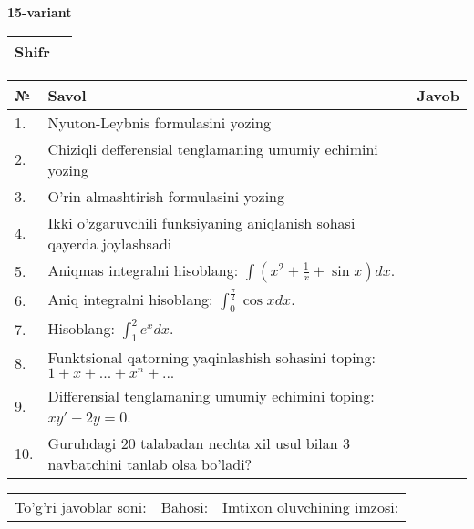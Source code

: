 \documentclass{article}
\begin{document}
  \egroup
  
  \newpage
  
  
  \textbf{15-variant}\\
  
  \bgroup
  \def\arraystretch{1.6} %
  
  \begin{tabular}{|m{5.7cm}|m{9.5cm}|}
  \hline
  Shifr & \\
  \hline
  \end{tabular}
  
  \vspace{1cm}
  
  \begin{tabular}{|m{0.7cm}|m{10cm}|m{4cm}|}
  \hline
  № & Savol & Javob \\
  \hline
  1. & Nyuton-Leybnis formulasini yozing &  \\
  \hline
  2. & Chiziqli defferensial tenglamaning umumiy echimini yozing &  \\
  \hline
  3. & O'rin almashtirish formulasini yozing &  \\
  \hline
  4. & Ikki o'zgaruvchili funksiyaning aniqlanish sohasi qayerda joylashsadi &  \\
  \hline
  5. & Aniqmas integralni hisoblang: \(\int {\left( x^{2} + \frac{1}{x} + \sin x \right)dx}\). &  \\
  \hline
  6. & Aniq integralni hisoblang: \(\int_{0}^{\frac{\pi}{2}}{\cos xdx}\). &  \\
  \hline
  7. & Hisoblang: \(\int_{1}^{2}{e^{x}dx}\). &  \\
  \hline
  8. & Funktsional qatorning yaqinlashish sohasini toping:\(1 + x + ... + x^{n} + ...\) &  \\
  \hline
  9. & Differensial tenglamaning umumiy echimini toping: \(xy' - 2y = 0\). &  \\
  \hline
  10. & Guruhdagi 20 talabadan nechta xil usul bilan 3 navbatchini tanlab olsa bo'ladi? &  \\
  \hline
  \end{tabular}
  
  \vspace{1cm}
  
  \begin{tabular}{lll}
  To'g'ri javoblar soni: \underline{\hspace{1.5cm}} & 
  Bahosi: \underline{\hspace{1.5cm}} & 
  Imtixon oluvchining imzosi: \underline{\hspace{2cm}} \\
  \end{tabular}
  
\end{document}
